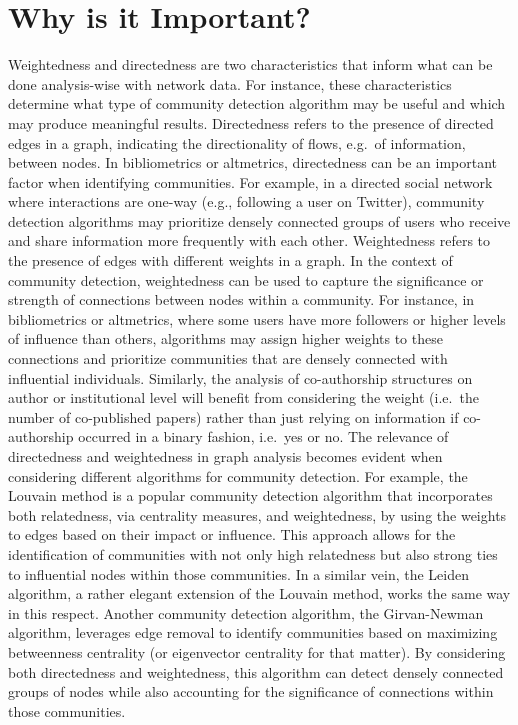 \documentclass[
  letterpaper,
]{scrreprt}
\begin{document}
\section{Why is it Important?}\label{why-is-it-important-10}

Weightedness and directedness are two characteristics that inform what
can be done analysis-wise with network data. For instance, these
characteristics determine what type of community detection algorithm may
be useful and which may produce meaningful results. Directedness refers
to the presence of directed edges in a graph, indicating the
directionality of flows, e.g.~of information, between nodes. In
bibliometrics or altmetrics, directedness can be an important factor
when identifying communities. For example, in a directed social network
where interactions are one-way (e.g., following a user on Twitter),
community detection algorithms may prioritize densely connected groups
of users who receive and share information more frequently with each
other. Weightedness refers to the presence of edges with different
weights in a graph. In the context of community detection, weightedness
can be used to capture the significance or strength of connections
between nodes within a community. For instance, in bibliometrics or
altmetrics, where some users have more followers or higher levels of
influence than others, algorithms may assign higher weights to these
connections and prioritize communities that are densely connected with
influential individuals. Similarly, the analysis of co-authorship
structures on author or institutional level will benefit from
considering the weight (i.e.~the number of co-published papers) rather
than just relying on information if co-authorship occurred in a binary
fashion, i.e.~yes or no. The relevance of directedness and weightedness
in graph analysis becomes evident when considering different algorithms
for community detection. For example, the Louvain method is a popular
community detection algorithm that incorporates both relatedness, via
centrality measures, and weightedness, by using the weights to edges
based on their impact or influence. This approach allows for the
identification of communities with not only high relatedness but also
strong ties to influential nodes within those communities. In a similar
vein, the Leiden algorithm, a rather elegant extension of the Louvain
method, works the same way in this respect. Another community detection
algorithm, the Girvan-Newman algorithm, leverages edge removal to
identify communities based on maximizing betweenness centrality (or
eigenvector centrality for that matter). By considering both
directedness and weightedness, this algorithm can detect densely
connected groups of nodes while also accounting for the significance of
connections within those communities.
\end{document}
